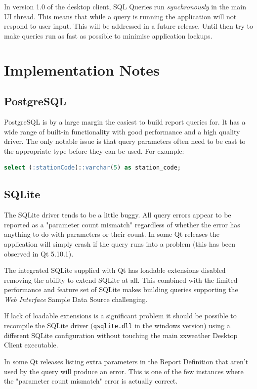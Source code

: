 \documentclass[a4paper,10pt]{book}
\begin{document}
In version 1.0 of the desktop client, SQL Queries run \emph{synchronously} in the main UI thread. This means that while a query is running the application will not respond to user input. This will be addressed in a future release. Until then try to make queries run as fast as possible to minimise application lockups.

\section{Implementation Notes}


\subsection{PostgreSQL}

PostgreSQL is by a large margin the easiest to build report queries for. It has a wide range of built-in functionality with good performance and a high quality driver. The only notable issue is that query parameters often need to be cast to the appropriate type before they can be used. For example: 

\begin{lstlisting}[language=SQL]
select (:stationCode)::varchar(5) as station_code;
\end{lstlisting}

\subsection{SQLite}
The SQLite driver tends to be a little buggy. All query errors appear to be reported as a "parameter count mismatch" regardless of whether the error has anything to do with parameters or their count. In some Qt releases the application will simply crash if the query runs into a problem (this has been observed in Qt 5.10.1). 

The integrated SQLite supplied with Qt has loadable extensions disabled removing the ability to extend SQLite at all. This combined with the limited performance and feature set of SQLite makes building queries supporting the \emph{Web Interface} Sample Data Source challenging. 

If lack of loadable extensions is a significant problem it should be possible to recompile the SQLite driver (\verb|qsqlite.dll| in the windows version) using a different SQLite configuration without touching the main zxweather Desktop Client executable.

In some Qt releases listing extra parameters in the Report Definition that aren't used by the query will produce an error. This is one of the few instances where the "parameter count mismatch" error is actually correct.
\end{document}
